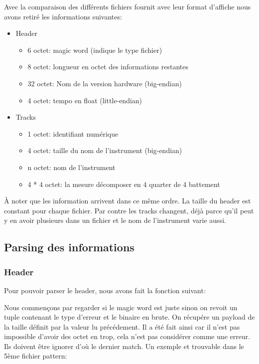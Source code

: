 \documentclass[10pt,a4paper]{article}
\begin{document}
Avec la comparaison des différents fichiers fournit avec leur format d'affiche nous avons retiré les informations suivantes:
\begin{itemize}
    \item Header
    \begin{itemize}
		\item 6 octet: magic word (indique le type fichier)
		\item 8 octet: longueur en octet des informations restantes
		\item 32 octet: Nom de la version hardware (big-endian)
		\item 4 octet: tempo en float (little-endian)  
    \end{itemize}
    
    \item Tracks	
    \begin{itemize}
    	\item 1 octet: identifiant numérique
    	\item 4 octet: taille du nom de l'instrument (big-endian)
    	\item n octet: nom de l'instrument 
    	\item 4 * 4 octet: la mesure décomposer en 4 quarter de 4 battement
    \end{itemize}
\end{itemize}

À noter que les information arrivent dans ce même ordre. La taille du header est constant pour chaque fichier. Par contre les tracks changent, déjà parce qu'il peut y en avoir plusieurs dans un fichier et le nom de l'instrument varie aussi.

\newpage

\subsection{Parsing des informations}

\subsubsection{Header}
Pour pouvoir parser le header, nous avons fait la fonction suivant:



Nous commençons par regarder si le magic word est juste sinon on revoit un tuple contenant le type d'erreur et le binaire en brute. On récupére un payload de la taille définit par la valeur lu précédement. Il a été fait ainsi car il n'est pas impossible d'avoir des octet en trop, cela n'est pas considérer comme une erreur. Ils doivent être ignorer d'où le dernier match. Un exemple et trouvable dans le 5ème fichier pattern:
\end{document}
